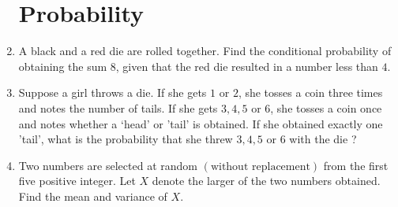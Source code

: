 \documentclass{article}
\providecommand{\brak}[1]{\ensuremath{\left(#1\right)}}
\begin{document}
\begin{enumerate}
\section{Probability}
\item A black and a red die are rolled together. Find the conditional probability of obtaining the sum $8$, given that the red die resulted in a number less than $4$.
\item Suppose a girl throws a die. If she gets $1$ or $2$, she tosses a coin three times and notes the number of tails. If she gets $3, 4, 5$ or $6$, she tosses a coin once and notes whether a ‘head’ or 'tail' is obtained. If she obtained exactly one 'tail', what is the probability that she threw $3, 4, 5$ or $6$ with the die ?
\item Two numbers are selected at random \brak{\text{without replacement}} from the first five positive integer. Let $X$ denote the larger of the two numbers obtained. Find the mean and variance of $X$.
\end{enumerate}
\end{document}
